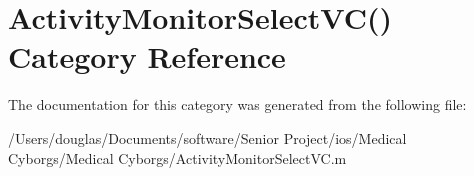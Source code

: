 \hypertarget{category_activity_monitor_select_v_c_07_08}{\section{Activity\-Monitor\-Select\-V\-C() Category Reference}
\label{category_activity_monitor_select_v_c_07_08}
}


The documentation for this category was generated from the following file\-:\begin{DoxyCompactItemize}
\item 
/\-Users/douglas/\-Documents/software/\-Senior Project/ios/\-Medical Cyborgs/\-Medical Cyborgs/Activity\-Monitor\-Select\-V\-C.\-m\end{DoxyCompactItemize}
